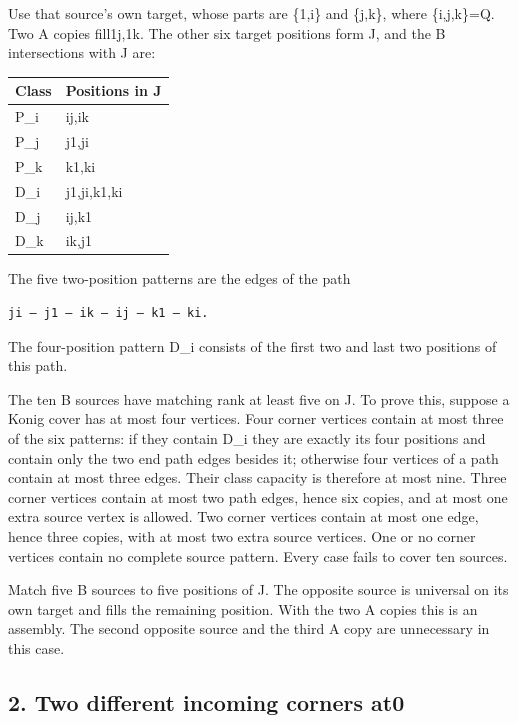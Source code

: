 \documentclass[
  10pt,
]{article}
\begin{document}
Use that source's own target, whose parts are \{1,i\} and \{j,k\}, where
\{i,j,k\}=Q. Two A copies fill1j,1k. The other six target positions form
J, and the B intersections with J are:

\begin{longtable}[]{@{}ll@{}}
\toprule\noalign{}
Class & Positions in J \\
\midrule\noalign{}
\endhead
\bottomrule\noalign{}
\endlastfoot
P\_i & ij,ik \\
P\_j & j1,ji \\
P\_k & k1,ki \\
D\_i & j1,ji,k1,ki \\
D\_j & ij,k1 \\
D\_k & ik,j1 \\
\end{longtable}

The five two-position patterns are the edges of the path

\begin{verbatim}
ji — j1 — ik — ij — k1 — ki.
\end{verbatim}

The four-position pattern D\_i consists of the first two and last two
positions of this path.

The ten B sources have matching rank at least five on J. To prove this,
suppose a Konig cover has at most four vertices. Four corner vertices
contain at most three of the six patterns: if they contain D\_i they are
exactly its four positions and contain only the two end path edges
besides it; otherwise four vertices of a path contain at most three
edges. Their class capacity is therefore at most nine. Three corner
vertices contain at most two path edges, hence six copies, and at most
one extra source vertex is allowed. Two corner vertices contain at most
one edge, hence three copies, with at most two extra source vertices.
One or no corner vertices contain no complete source pattern. Every case
fails to cover ten sources.

Match five B sources to five positions of J. The opposite source is
universal on its own target and fills the remaining position. With the
two A copies this is an assembly. The second opposite source and the
third A copy are unnecessary in this case.

\hypertarget{two-different-incoming-corners-at0}{%
\subsection*{2. Two different incoming corners
at0}\label{two-different-incoming-corners-at0}}
\end{document}
